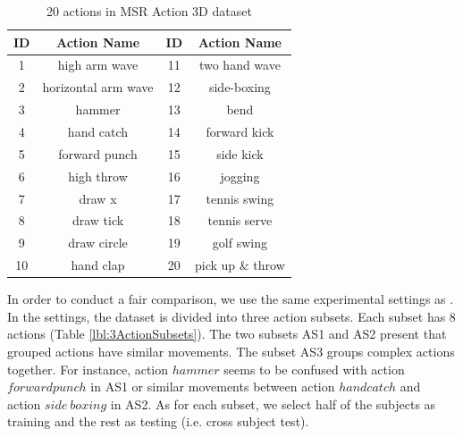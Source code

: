 \documentclass[review]{elsarticle}
\begin{document}
\begin{table}[H]
	\begin{center}
		\begin{tabular}{c|c|c|c}
		
		  {\bf   ID  } & {\bf Action Name} &   {\bf   ID  } & {\bf Action Name} \\
		\hline
		             1 &  high arm wave &             11 &  two hand wave \\
		
		             2 & horizontal arm wave &             12 &    side-boxing \\
		
		             3 &         hammer &             13 &           bend \\
		
		             4 &     hand catch &             14 &   forward kick \\
		
		             5 &  forward punch &             15 &      side kick \\
		
		             6 &     high throw &             16 &        jogging \\
		
		             7 &         draw x &             17 &   tennis swing \\
		
		             8 &      draw tick &             18 &   tennis serve \\
		
		             9 &    draw circle &             19 &     golf swing \\
		
		            10 &      hand clap &             20 & pick up \& throw \\
		
		\end{tabular}
	\end{center}
	\caption{\label{lbl:20actions}20 actions in MSR Action 3D dataset}
\end{table}

In order to conduct a fair comparison, we use the same experimental settings as \cite{li2010action, yang2012eigenjoints, yang2012recognizing, wang2012mining, xia2013spatio, oreifej2013hon4d}. In the settings, the dataset is divided into three action subsets. Each subset has 8 actions (Table \ref{lbl:3ActionSubsets}). The two subsets AS1 and AS2 present that grouped actions have similar movements. The subset AS3 groups complex actions together. For instance, action $hammer$ seems to be confused with action $forward punch$ in AS1 or similar movements between action $hand catch$ and action $side\ boxing$ in AS2. As for each subset, we select half of the subjects as training and the rest as testing (i.e. cross subject test).
\end{document}
